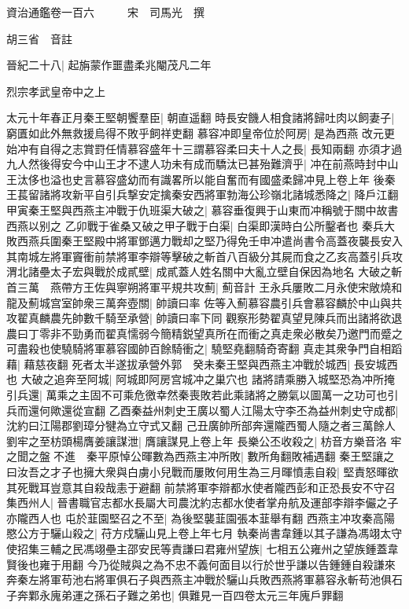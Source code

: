 資治通鑑卷一百六　　　宋　司馬光　撰

胡三省　音註

晉紀二十八|{
	起旃蒙作噩盡柔兆閹茂凡二年}


烈宗孝武皇帝中之上

太元十年春正月秦王堅朝饗羣臣|{
	朝直遥翻}
時長安饑人相食諸將歸吐肉以飼妻子|{
	窮匱如此外無救援烏得不敗乎飼祥吏翻}
慕容冲即皇帝位於阿房|{
	是為西燕}
改元更始冲有自得之志賞罸任情慕容盛年十三謂慕容柔曰夫十人之長|{
	長知兩翻}
亦須才過九人然後得安今中山王才不逮人功未有成而驕汰已甚殆難濟乎|{
	冲在前燕時封中山王汰侈也溢也史言慕容盛幼而有識畧所以能自奮而有國盛柔歸冲見上卷上年}
後秦王萇留諸將攻新平自引兵撃安定擒秦安西將軍勃海公珍嶺北諸城悉降之|{
	降戶江翻}
甲寅秦王堅與西燕主冲戰于仇班渠大破之|{
	慕容垂復興于山東而冲稱號于關中故書西燕以别之}
乙卯戰于雀桑又破之甲子戰于白渠|{
	白渠即漢時白公所鑿者也}
秦兵大敗西燕兵圍秦王堅殿中將軍鄧邁力戰却之堅乃得免壬申冲遣尚書令高蓋夜襲長安入其南城左將軍竇衝前禁將軍李辯等擊破之斬首八百級分其屍而食之乙亥高蓋引兵攻渭北諸壘太子宏與戰於成貳壁|{
	成貳蓋人姓名關中大亂立壁自保因為地名}
大破之斬首三萬　燕帶方王佐與寧朔將軍平規共攻薊|{
	薊音計}
王永兵屢敗二月永使宋敞燒和龍及薊城宫室帥衆三萬奔壺關|{
	帥讀曰率}
佐等入薊慕容農引兵會慕容麟於中山與共攻翟真麟農先帥數千騎至承營|{
	帥讀曰率下同}
觀察形勢翟真望見陳兵而出諸將欲退農曰丁零非不勁勇而翟真懦弱今簡精鋭望真所在而衝之真走衆必散矣乃邀門而蹙之可盡殺也使驍騎將軍慕容國帥百餘騎衝之|{
	驍堅堯翻騎奇寄翻}
真走其衆争門自相蹈藉|{
	藉慈夜翻}
死者太半遂拔承營外郭　癸未秦王堅與西燕主冲戰於城西|{
	長安城西也}
大破之追奔至阿城|{
	阿城即阿房宫城冲之巢穴也}
諸將請乘勝入城堅恐為冲所掩引兵還|{
	萬乘之主固不可乘危徼幸然秦喪敗若此乘諸將之勝氣以圖萬一之功可也引兵而還何歟還從宣翻}
乙酉秦益州刺史王廣以蜀人江陽太守李丕為益州刺史守成都|{
	沈約曰江陽郡劉璋分犍為立守式又翻}
己丑廣帥所部奔還隴西蜀人隨之者三萬餘人　劉牢之至枋頭楊膺姜讓謀泄|{
	膺讓謀見上卷上年}
長樂公丕收殺之|{
	枋音方樂音洛}
牢之聞之盤不進　秦平原悼公暉數為西燕主冲所敗|{
	數所角翻敗補遇翻}
秦王堅讓之曰汝吾之才子也擁大衆與白虜小兒戰而屢敗何用生為三月暉憤恚自殺|{
	堅責怒暉欲其死戰耳豈意其自殺哉恚于避翻}
前禁將軍李辯都水使者隴西彭和正恐長安不守召集西州人|{
	晉書職官志都水長屬大司農沈約志都水使者掌舟航及運部李辯李儼之子亦隴西人也}
屯於韮園堅召之不至|{
	為後堅襲韮園張本韮舉有翻}
西燕主冲攻秦高陽愍公方于驪山殺之|{
	苻方戍驪山見上卷上年七月}
執秦尚書韋鍾以其子謙為馮翊太守使招集三輔之民馮翊壘主邵安民等責謙曰君雍州望族|{
	七相五公雍州之望族鍾蓋韋賢後也雍于用翻}
今乃從賊與之為不忠不義何面目以行於世乎謙以告鍾鍾自殺謙來奔秦左將軍苟池右將軍俱石子與西燕主冲戰於驪山兵敗西燕將軍慕容永斬苟池俱石子奔鄴永廆弟運之孫石子難之弟也|{
	俱難見一百四卷太元三年廆戶罪翻}
